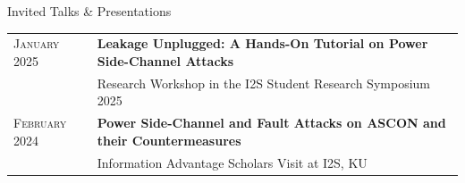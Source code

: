\begin{rSection}{Invited Talks \& Presentations}

\begin{tabular}{lp{16cm}}
    \textsc{January 2025} & \textbf{Leakage Unplugged: A Hands-On Tutorial on Power Side-Channel Attacks} \\
                      & Research Workshop in the I2S Student Research Symposium 2025 \\

    \textsc{February 2024} & \textbf{Power Side-Channel and Fault Attacks on ASCON and their Countermeasures} \\
                      & Information Advantage Scholars Visit at I2S, KU \\

\end{tabular}

\end{rSection}
